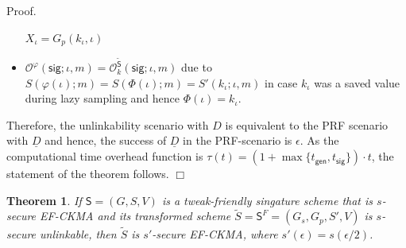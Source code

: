 \documentclass{article}
\newtheorem{theorem}{Theorem}[section]
\newenvironment{proof}{\textsf{Proof}.}{\hfill$\Box$}
\begin{document}
\begin{proof}
\begin{itemize}
$X_\iota = G_p(k_\iota,\iota)$
\item
$\mathcal{O}^\varphi(\mathsf{sig};\iota,m) = \mathcal{O}^{\tilde{\mathsf{S}}}_k(\mathsf{sig};\iota,m)$
due to $S(\varphi(\iota);m)=S(\Phi(\iota);m)=S'(k_\iota;\iota,m)$ in case $k_\iota$ was a saved value during lazy sampling and hence $\Phi(\iota)=k_\iota$.
\end{itemize}
Therefore, the unlinkability scenario with $D$ is equivalent to the PRF scenario with $\underline{D}$ and
hence, the success of $\underline{D}$ in the PRF-scenario is $\epsilon$. As the computational time overhead function is $\tau(t) = (1+\max\{t_\mathsf{gen},t_\mathsf{sig}\})\cdot t$, the statement of the theorem follows.
\end{proof}

\begin{theorem}
If $\mathsf{S}=(G,S,V)$ is a tweak-friendly singature scheme that is $s$-secure EF-CKMA and
its transformed scheme $\tilde{S}=\mathsf{S}^F=(G_s,G_p,S',V)$ is $s$-secure unlinkable, then
$\tilde{S}$ is $s'$-secure EF-CKMA, where $s'(\epsilon) = s(\epsilon/2)$.
\end{theorem}
\end{document}
